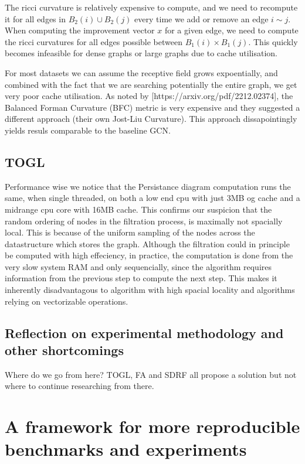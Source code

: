 \documentclass[a4paper,12pt]{article}
\begin{document}
The ricci curvature is relatively expensive to compute, and we need to recompute it for all edges in \(B_2(i) \cup B_2(j)\) every time we add or remove an edge \(i \sim j\). 
When computing the improvement vector \(x\) for a given edge, we need to compute the ricci curvatures for all edges possible between \(B_1(i) \times B_1(j)\). 
This quickly becomes infeasible for dense graphs or large graphs due to cache utilisation.

For most datasets we can assume the receptive field grows expoentially, and combined with the fact that we are searching potentially the entire graph, we get very poor cache utilisation.
As noted by [https://arxiv.org/pdf/2212.02374], the Balanced Forman Curvature (BFC) metric is very expensive and they suggested a different
approach (their own Jost-Liu Curvature). This approach dissapointingly yields resuls comparable to the baseline GCN.

\subsection{TOGL}

Performance wise we notice that the Persistance diagram computation runs the same, when single threaded, on both a low end cpu with just 3MB og cache and a midrange cpu core with 16MB cache. This confirms our suspicion that the random ordering of nodes in the filtration process, is maximally not spacially local. This is because of the uniform sampling of the nodes across the datastructure which stores the graph. Although the filtration could in principle be computed with high effeciency, in practice, the computation is done from the very slow system RAM and only sequencially, since the algorithm requires information from the previous step to compute the next step. This makes it inherently disadvantagous to algorithm with high spacial locality and algorithms relying on vectorizable operations.

\subsection{Reflection on experimental methodology and other shortcomings}
Where do we go from here? TOGL, FA and SDRF all propose a solution but
not where to continue researching from there.


\section{A framework for more reproducible benchmarks and experiments}
\end{document}
